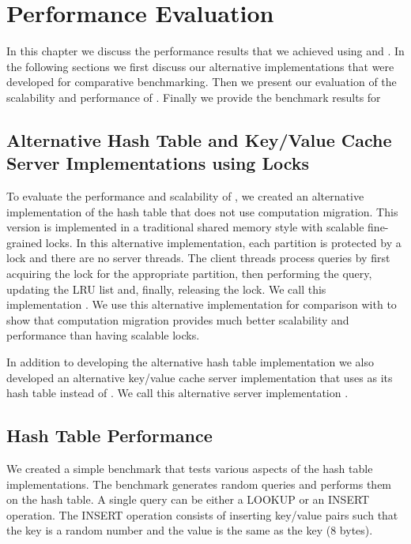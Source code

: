 \section{Performance Evaluation}
\label{chap:eval}

In this chapter we discuss the performance results that we achieved using \cphash{} and \cpserver{}. In the following sections we 
first discuss our alternative implementations that were developed for comparative benchmarking. Then we present our evaluation of the scalability 
and performance of \cphash{}. Finally we provide the benchmark results for \cpserver{}

\subsection{Alternative Hash Table and Key/Value Cache Server Implementations using Locks}

To evaluate the performance and scalability of \cphash{}, we created an alternative implementation
of the hash table that does not use computation migration. This version is implemented in a traditional shared memory 
style with scalable fine-grained locks. In this alternative implementation, each partition is protected by
a lock and there are no server threads. The client threads process queries by first acquiring the lock for
the appropriate partition, then performing the query, updating the LRU list and, finally, releasing the lock. We call this implementation \lockhash{}.
We use this alternative implementation for comparison with \cphash{} to show that computation migration provides much
better scalability and performance than having scalable locks.

In addition to developing the alternative hash table implementation we also developed an alternative key/value cache server implementation
that uses \lockhash{} as its hash table instead of \cphash{}. We call this alternative server implementation \lockserver{}.

\subsection{Hash Table Performance}

We created a simple benchmark that tests various aspects of the hash table implementations. The benchmark generates random queries and
performs them on the hash table. A single query can be either a LOOKUP or an INSERT operation. The INSERT operation consists of 
inserting key/value pairs such that the key is a random number and the value is the same as the key (8 bytes). 

